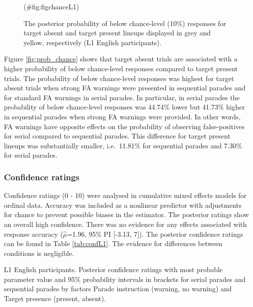 \begin{appendix}
\begin{figure}[!ht]
{}

\caption{\label{fig:prob_chanceL1}The posterior probability of below chance-level (10\%) responses for target absent and target present lineups displayed in grey and yellow, respectively (L1 English participants).}(\#fig:figchanceL1)
\end{figure}

Figure \ref{fig:prob_chance} shows that target absent trials are
associated with a higher probability of below chance-level responses
compared to target present trials. The probability of below chance-level
responses was highest for target absent trials when strong FA warnings
were presented in sequential parades and for standard FA warnings in
serial parades. In particular, in serial parades the probability of
below chance-level responses was 44.74\% lower but 41.73\% higher in
sequential parades when strong FA warnings were provided. In other
words, FA warnings have opposite effects on the probability of observing
false-positives for serial compared to sequential parades. This
difference for target present lineups was substantially smaller,
i.e.~11.81\% for sequential parades and 7.30\% for serial parades.

\hypertarget{confidence-ratings}{%
\subsubsection{Confidence ratings}\label{confidence-ratings}}

Confidence ratings (0 - 10) were analysed in cumulative mixed effects
models for ordinal data. Accuracy was included as a nonlinear predictor
with adjustments for chance to prevent possible biases in the estimator.
The posterior ratings show an overall high confidence. There was no
evidence for any effects associated with response accuracy
(\(\hat{\mu}\)=1.96, 95\% PI {[}-3.13, 7{]}). The posterior confidence
ratings can be found in Table \ref{tab:confL1}. The evidence for
differences between conditions is negligible.

\begin{table}[h]

\begin{center}
\begin{threeparttable}

\caption{\label{tab:unnamed-chunk-8}\label{tab:confL1}L1 English participants. Posterior confidence ratings with
                  most probable parameter value and 95\% probability intervals in brackets for serial parades and sequential parades by factors Parade instruction (warning, no warning) and Target presence (present, absent).}


\end{threeparttable}
\end{center}
\end{table}
\end{appendix}
